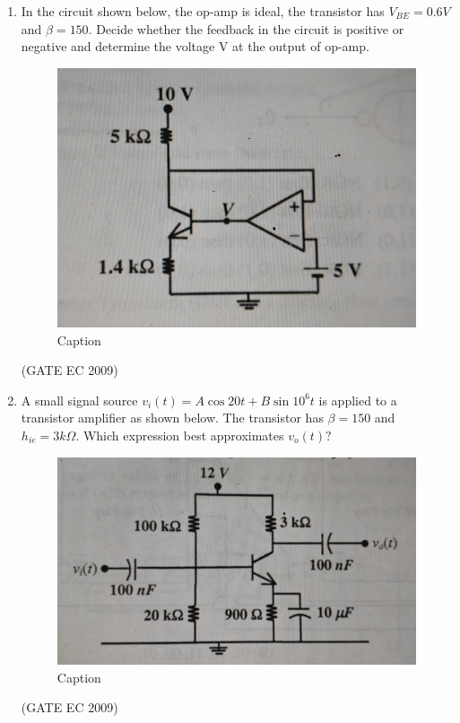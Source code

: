 \documentclass[journal,12pt,onecolumn]{IEEEtran}
\theoremstyle{remark}
\begin{document}
\begin{enumerate}[start=1, label={Q\arabic*.}]
\item In the circuit shown below, the op-amp is ideal, the transistor has $V_{BE} = 0.6 V$ and $\beta = 150$. Decide whether the feedback in the circuit is positive or negative and determine the voltage V at the output of op-amp.     
\begin{figure}[H]
    \centering
    \includegraphics[width=0.5\linewidth]{images/img_14.jpg}
    \caption{Caption}
    \label{fig:placeholder}
\end{figure}
\begin{enumerate}[label=(\Alph*)]
\end{enumerate}
\hfill (GATE EC 2009)

\item A small signal source $v_i(t) = A\cos{20t} + B \sin{10^6t}$ is applied to a transistor amplifier as shown below. The transistor has $\beta = 150$ and $h_{ie} = 3k\Omega$. Which expression best approximates $v_o(t) ?$
\begin{figure}[H]
    \centering
    \includegraphics[width=0.5\linewidth]{images/img_15.jpg}
    \caption{Caption}
    \label{fig:placeholder}
\end{figure}
\begin{enumerate}[label=(\Alph*)]
\end{enumerate}
\hfill (GATE EC 2009)


\end{enumerate}
\end{document}
